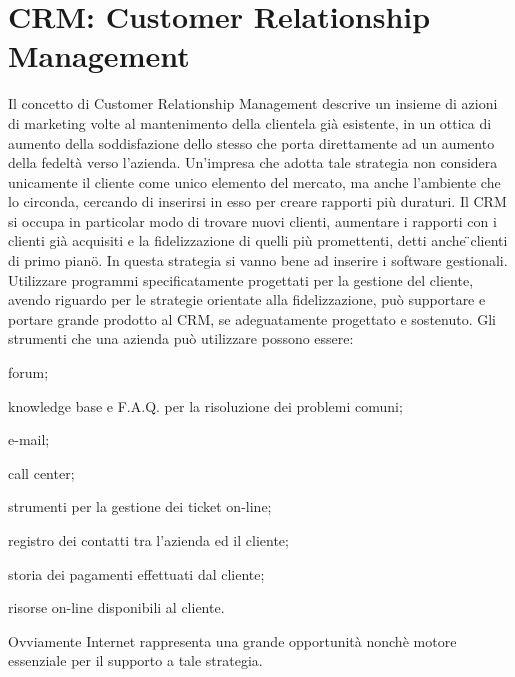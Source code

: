 \section{CRM: Customer Relationship Management}
Il concetto di Customer Relationship Management descrive un insieme di azioni di
marketing volte al mantenimento della clientela gi\` a esistente, in un ottica
di aumento della soddisfazione dello stesso che porta direttamente ad un aumento
della fedelt\` a verso l'azienda. Un'impresa che adotta tale strategia non
considera unicamente il cliente come unico elemento del mercato, ma anche
l'ambiente che lo circonda, cercando di inserirsi in esso per creare rapporti
pi\` u duraturi. Il CRM si occupa in particolar modo di trovare nuovi clienti,
aumentare i rapporti con i clienti gi\`a  acquisiti e la fidelizzazione di
quelli pi\` u promettenti, detti anche \"{}clienti di primo piano\"{}.
In questa strategia si vanno bene ad inserire i software gestionali. Utilizzare
programmi specificatamente progettati per la gestione del cliente, avendo
riguardo per le strategie orientate alla fidelizzazione, pu\` o supportare e
portare grande prodotto al CRM, se adeguatamente progettato e sostenuto. Gli
strumenti che una azienda pu\` o utilizzare possono essere: 
  \begin{elencopuntato}[\subsecindent]
  	\item forum;
    \item  knowledge base e F.A.Q. per la risoluzione dei problemi comuni;
    \item  e-mail;
    \item  call center;
    \item  strumenti per la gestione dei ticket on-line;
    \item  registro dei contatti tra l'azienda ed il cliente;
    \item storia dei pagamenti effettuati dal cliente;
    \item  risorse on-line disponibili al cliente.
  \end{elencopuntato}
Ovviamente Internet rappresenta una grande opportunit\`  a nonch\` e motore
essenziale per il supporto a tale strategia.


